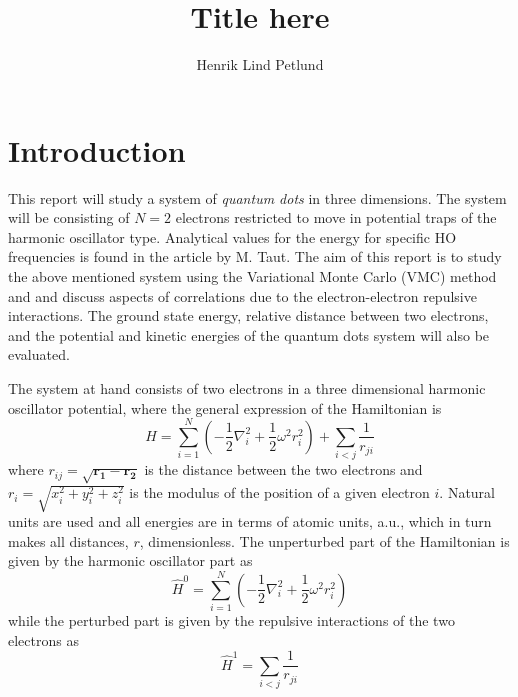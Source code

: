 \documentclass[12pt,english,a4paper]{article}
\title{Title here}
\author{Henrik Lind Petlund}
\begin{document}
\begin{titlepage}
\maketitle
\begin{abstract}

\newpage

\end{abstract}
\tableofcontents
\end{titlepage}

\section{Introduction} \label{section:introduction}
This report will study a system of \textit{quantum dots} in three dimensions. The system will be consisting of $N=2$ electrons restricted to move in potential traps of the harmonic oscillator type. Analytical values for the energy for specific HO frequencies is found in the article \cite{Taut} by M. Taut. The aim of this report is to study the above mentioned system using the Variational Monte Carlo (VMC) method and and discuss aspects of correlations due to the electron-electron repulsive interactions. The ground state energy, relative distance between two electrons, and the potential and kinetic energies of the quantum dots system will also be evaluated.

The system at hand consists of two electrons in a three dimensional harmonic oscillator potential, where the general expression of the Hamiltonian is
\begin{equation}
    \hat H = \sum_{i=1}^N \left(-\frac{1}{2}\nabla_i^2 +\frac{1}{2}\omega^2r_i^2\right)+\sum_{i<j}\frac{1}{r_{ji}}
    \label{eq:hamiltonian_total}
\end{equation}
where $r_{ij}=\sqrt{\boldsymbol{r_1}-\boldsymbol{r_2}}$ is the distance between the two electrons and $r_i=\sqrt{x_i^2+y_i^2+z_i^2}$ is the modulus of the position of a given electron $i$. Natural units are used and all energies are in terms of atomic units, a.u., which in turn makes all distances, $r$, dimensionless. The unperturbed part of the Hamiltonian is given by the harmonic oscillator part as
\begin{equation}
    \hat H^0 = \sum_{i=1}^N \left(-\frac{1}{2}\nabla_i^2 +\frac{1}{2}\omega^2r_i^2\right)
    \label{eq:hamiltonian_unperturbed}
\end{equation}
while the perturbed part is given by the repulsive interactions of the two electrons as
\begin{equation}
    \hat H^1 = \sum_{i<j}\frac{1}{r_{ji}}
    \label{eq:hamiltonian_perturbed}
\end{equation}
\end{document}
